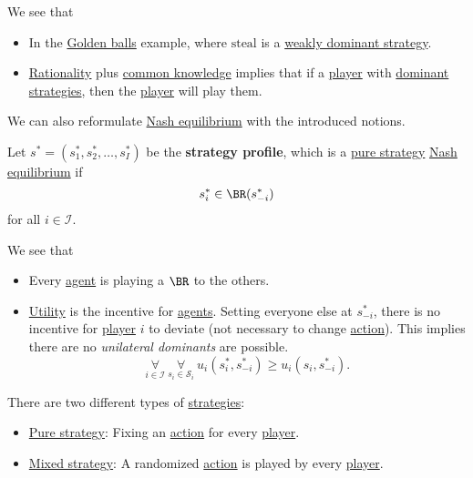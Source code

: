\begin{remark}
	We see that
	\begin{itemize}
		\item In the \hyperref[eg:golden-ball]{Golden balls} example, where \(\text{steal}\) is a \hyperref[def:weakly-dominant-strategy]{weakly dominant strategy}.
		\item \hyperref[rationality]{Rationality} plus \hyperref[common-knowledge]{common knowledge} implies that if a \hyperref[def:player]{player} with \hyperref[def:dominant-strategy]{dominant strategies}, then the \hyperref[def:player]{player} will play them.
	\end{itemize}
\end{remark}

We can also reformulate \hyperref[def:Nash-equilibrium]{Nash equilibrium} with the introduced notions.

\begin{prev}
	Let \(s^{\ast} = (s_1^{\ast}, s_2^{\ast}, \dots , s_I^{\ast})\) be the \textbf{strategy profile}, which is a \hyperref[def:pure-strategy]{pure strategy} \hyperref[def:Nash-equilibrium]{Nash equilibrium} if
	\[
		s_{i}^{\ast}\in\BR(s_{-i}^{\ast})
	\]
	for all \(i\in \mathcal{I} \).
\end{prev}

\begin{note}
	We see that
	\begin{itemize}
		\item Every \hyperref[def:player]{agent} is playing a \(\BR\) to the others.
		\item \hyperref[def:reward]{Utility} is the incentive for \hyperref[def:player]{agents}. Setting everyone else at \(s^{\ast}_{-i}\), there is no incentive for \hyperref[def:player]{player} \(i\) to deviate (not necessary to change \hyperref[def:strategy]{action}). This implies there are no \emph{unilateral dominants} are possible.
		      \[
			      \underset{i\in \mathcal{I}}{\forall}\ \underset{s_{i}\in \mathcal{S}_i}{\forall}\ u_{i}(s^{\ast}_i, s^{\ast}_{-i}) \geq u_{i}(s_{i}, s^{\ast}_{-i}).
		      \]
	\end{itemize}
\end{note}

\begin{prev}
	There are two different types of \hyperref[def:strategy]{strategies}:
	\begin{itemize}
		\item \hyperref[def:pure-strategy]{Pure strategy}: Fixing an \hyperref[def:strategy]{action} for every \hyperref[def:player]{player}.
		\item \hyperref[def:mixed-strategy]{Mixed strategy}: A randomized \hyperref[def:strategy]{action} is played by every \hyperref[def:player]{player}.
	\end{itemize}
\end{prev}

